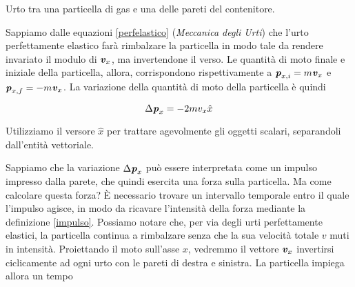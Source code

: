 \begin{marginfigure}
    \begin{center}
    \end{center}
    \caption{Urto tra una particella di gas e una delle pareti
    del contenitore.}
    \label{wall}
\end{marginfigure}

Sappiamo dalle equazioni \ref{perfelastico} (\textit{Meccanica degli Urti}) che l'urto perfettamente
elastico farà rimbalzare la particella in modo tale da rendere
invariato il modulo di $\textbf{\textit{v}}_x$, ma invertendone il verso.
Le quantità di moto finale e iniziale della particella, allora,
corrispondono rispettivamente a $\textbf{\textit{p}}_{x,i} = m\textbf{\textit{v}}_x$
e $\textbf{\textit{p}}_{x,f} = -m\textbf{\textit{v}}_x$. La variazione della quantità
di moto della particella è quindi

\[ \Delta\textbf{\textit{p}}_x = -2mv_x \hat{x} \]

\noindent Utilizziamo il versore $\hat{x}$ per trattare agevolmente gli
oggetti scalari, separandoli dall'entità vettoriale.

Sappiamo che la variazione $\Delta\textbf{\textit{p}}_x$ può essere interpretata
come un impulso impresso dalla parete, che quindi esercita una forza
sulla particella. Ma come calcolare questa forza? È necessario trovare
un intervallo temporale entro il quale l'impulso agisce, in modo da
ricavare l'intensità della forza mediante la definizione \ref{impulso}.
Possiamo notare che, per via degli urti perfettamente elastici, la particella
continua a rimbalzare senza che la sua velocità totale $v$ muti in
intensità.
Proiettando il moto sull'asse $x$, vedremmo il vettore $\textbf{\textit{v}}_x$
invertirsi ciclicamente ad ogni urto con le pareti di destra e sinistra.
La particella impiega allora un tempo

